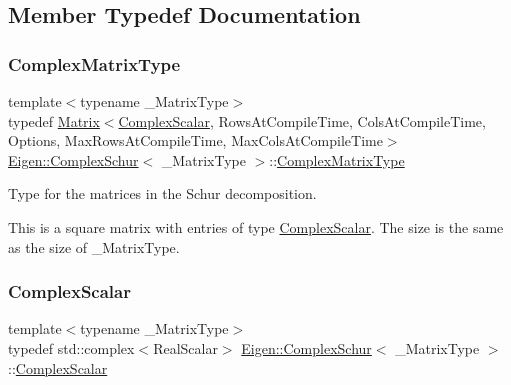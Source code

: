 \subsection{Member Typedef Documentation}
\mbox{\label{class_eigen_1_1_complex_schur_af61fe57877d51cfb50178f78534042f0}} 
\subsubsection{\texorpdfstring{ComplexMatrixType}{ComplexMatrixType}}
{\footnotesize\ttfamily template$<$typename \+\_\+\+Matrix\+Type$>$ \\
typedef \mbox{\hyperlink{class_eigen_1_1_matrix}{Matrix}}$<$\mbox{\hyperlink{class_eigen_1_1_complex_schur_ae1a4713b53f821867fbad617e426832a}{Complex\+Scalar}}, Rows\+At\+Compile\+Time, Cols\+At\+Compile\+Time, Options, Max\+Rows\+At\+Compile\+Time, Max\+Cols\+At\+Compile\+Time$>$ \mbox{\hyperlink{class_eigen_1_1_complex_schur}{Eigen\+::\+Complex\+Schur}}$<$ \+\_\+\+Matrix\+Type $>$\+::\mbox{\hyperlink{class_eigen_1_1_complex_schur_af61fe57877d51cfb50178f78534042f0}{Complex\+Matrix\+Type}}}



Type for the matrices in the Schur decomposition. 

This is a square matrix with entries of type \mbox{\hyperlink{class_eigen_1_1_complex_schur_ae1a4713b53f821867fbad617e426832a}{Complex\+Scalar}}. The size is the same as the size of {\ttfamily \+\_\+\+Matrix\+Type}. \mbox{\label{class_eigen_1_1_complex_schur_ae1a4713b53f821867fbad617e426832a}} 
\subsubsection{\texorpdfstring{ComplexScalar}{ComplexScalar}}
{\footnotesize\ttfamily template$<$typename \+\_\+\+Matrix\+Type$>$ \\
typedef std\+::complex$<$Real\+Scalar$>$ \mbox{\hyperlink{class_eigen_1_1_complex_schur}{Eigen\+::\+Complex\+Schur}}$<$ \+\_\+\+Matrix\+Type $>$\+::\mbox{\hyperlink{class_eigen_1_1_complex_schur_ae1a4713b53f821867fbad617e426832a}{Complex\+Scalar}}}



